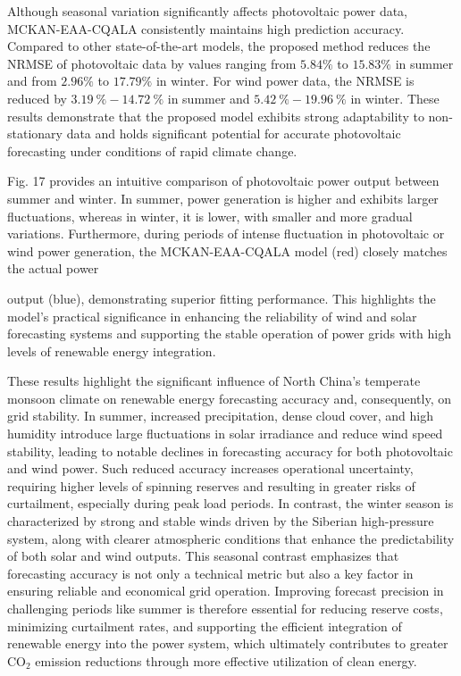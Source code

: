\documentclass[
  10
]{article}
\begin{document}
Although seasonal variation significantly affects photovoltaic power
data, MCKAN-EAA-CQALA consistently maintains high prediction accuracy.
Compared to other state-of-the-art models, the proposed method reduces
the NRMSE of photovoltaic data by values ranging from \(5 . 8 4 \%\) to
\(1 5 . 8 3 \%\) in summer and from \(2 . 9 6 \%\) to \(1 7 . 7 9 \%\)
in winter. For wind power data, the NRMSE is reduced by
\(3 . 1 9 \ \% - 1 4 . 7 2 \ \%\) in summer and
\(5 . 4 2 \ \% - 1 9 . 9 6 \ \%\) in winter. These results demonstrate
that the proposed model exhibits strong adaptability to non-stationary
data and holds significant potential for accurate photovoltaic
forecasting under conditions of rapid climate change.

Fig. 17 provides an intuitive comparison of photovoltaic power output
between summer and winter. In summer, power generation is higher and
exhibits larger fluctuations, whereas in winter, it is lower, with
smaller and more gradual variations. Furthermore, during periods of
intense fluctuation in photovoltaic or wind power generation, the
MCKAN-EAA-CQALA model (red) closely matches the actual power

output (blue), demonstrating superior fitting performance. This
highlights the model's practical significance in enhancing the
reliability of wind and solar forecasting systems and supporting the
stable operation of power grids with high levels of renewable energy
integration.

These results highlight the significant influence of North China's
temperate monsoon climate on renewable energy forecasting accuracy and,
consequently, on grid stability. In summer, increased precipitation,
dense cloud cover, and high humidity introduce large fluctuations in
solar irradiance and reduce wind speed stability, leading to notable
declines in forecasting accuracy for both photovoltaic and wind power.
Such reduced accuracy increases operational uncertainty, requiring
higher levels of spinning reserves and resulting in greater risks of
curtailment, especially during peak load periods. In contrast, the
winter season is characterized by strong and stable winds driven by the
Siberian high-pressure system, along with clearer atmospheric conditions
that enhance the predictability of both solar and wind outputs. This
seasonal contrast emphasizes that forecasting accuracy is not only a
technical metric but also a key factor in ensuring reliable and
economical grid operation. Improving forecast precision in challenging
periods like summer is therefore essential for reducing reserve costs,
minimizing curtailment rates, and supporting the efficient integration
of renewable energy into the power system, which ultimately contributes
to greater \(\mathrm { C O } _ { 2 }\) emission reductions through more
effective utilization of clean energy.
\end{document}

